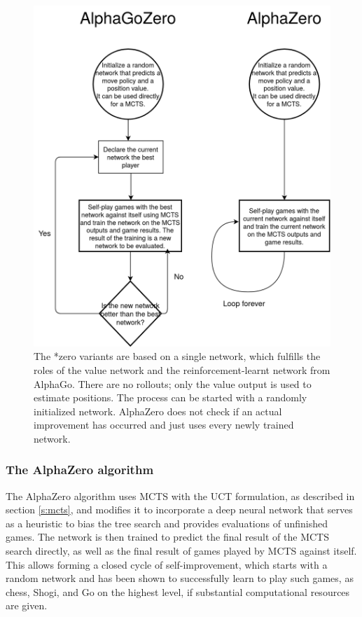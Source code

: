 \documentclass[12pt,onecolumn,oneside,titlepage]{article}
\begin{document}
\begin{figure}[H]
\centering
\includegraphics[clip,width=0.8\columnwidth]{alphazero}
\caption{The *zero variants are based on a single network, which fulfills the roles of the value network and the reinforcement-learnt network from AlphaGo.
There are no rollouts; only the value output is used to estimate positions. The process can be started with a randomly initialized network.
AlphaZero does not check if an actual improvement has occurred and just uses every newly trained network.}
\label{fig:alphazero_overview}
\end{figure}



\subsubsection{The AlphaZero algorithm}
\label{s:azalgo}

The AlphaZero algorithm \cite{silver2018general} uses MCTS with the UCT formulation, as described in section \ref{s:mcts}, and modifies it to incorporate a deep neural network 
that serves as a heuristic to bias the tree search and provides evaluations of unfinished games.
The network is then trained to predict the final result of the MCTS search directly, as well as the final result of games played by MCTS against itself.
This allows forming a closed cycle of self-improvement, which starts with a random network and has been shown to successfully 
learn to play such games, as chess, Shogi, and Go on the highest level, if substantial computational resources are given.
\end{document}
